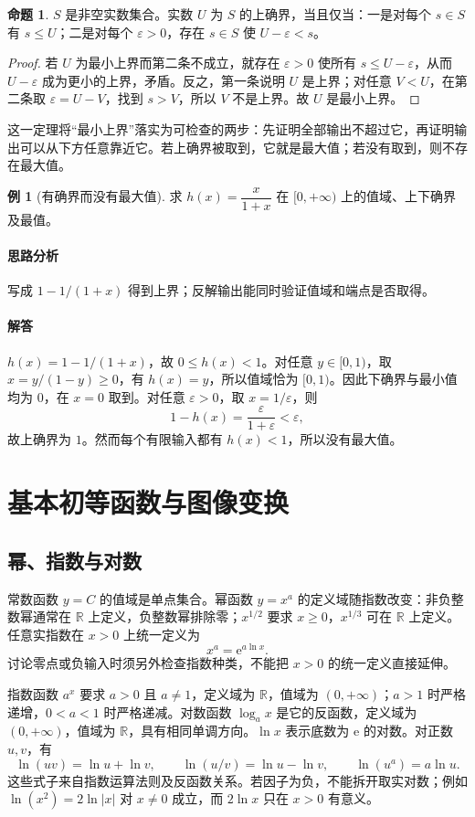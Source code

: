 \documentclass[UTF8,fontset=fandol,12pt,oneside,openany]{ctexrep}
\newcommand{\R}{\mathbb R}
\newcommand{\ee}{\mathrm e}
\theoremstyle{definition}
\newtheorem{proposition}[theorem]{命题}
\newtheorem{example}{例}[chapter]
\begin{document}
\begin{proposition}
$S$ 是非空实数集合。实数 $U$ 为 $S$ 的上确界，当且仅当：一是对每个 $s\in S$ 有 $s\le U$；二是对每个 $\varepsilon>0$，存在 $s\in S$ 使 $U-\varepsilon<s$。
\end{proposition}
\begin{proof}
若 $U$ 为最小上界而第二条不成立，就存在 $\varepsilon>0$ 使所有 $s\le U-\varepsilon$，从而 $U-\varepsilon$ 成为更小的上界，矛盾。反之，第一条说明 $U$ 是上界；对任意 $V<U$，在第二条取 $\varepsilon=U-V$，找到 $s>V$，所以 $V$ 不是上界。故 $U$ 是最小上界。
\end{proof}
这一定理将“最小上界”落实为可检查的两步：先证明全部输出不超过它，再证明输出可以从下方任意靠近它。若上确界被取到，它就是最大值；若没有取到，则不存在最大值。

\begin{example}[有确界而没有最大值]
求 $h(x)=\dfrac{x}{1+x}$ 在 $[0,+\infty)$ 上的值域、上下确界及最值。
\end{example}
\paragraph{思路分析} 写成 $1-1/(1+x)$ 得到上界；反解输出能同时验证值域和端点是否取得。
\paragraph{解答} $h(x)=1-1/(1+x)$，故 $0\le h(x)<1$。对任意 $y\in[0,1)$，取 $x=y/(1-y)\ge0$，有 $h(x)=y$，所以值域恰为 $[0,1)$。因此下确界与最小值均为 $0$，在 $x=0$ 取到。对任意 $\varepsilon>0$，取 $x=1/\varepsilon$，则
\[
 1-h(x)=\frac{\varepsilon}{1+\varepsilon}<\varepsilon,
\]
故上确界为 $1$。然而每个有限输入都有 $h(x)<1$，所以没有最大值。

\section{基本初等函数与图像变换}
\label{lec:01:elementary}
\subsection{幂、指数与对数}
常数函数 $y=C$ 的值域是单点集合。幂函数 $y=x^a$ 的定义域随指数改变：非负整数幂通常在 $\R$ 上定义，负整数幂排除零；$x^{1/2}$ 要求 $x\ge0$，$x^{1/3}$ 可在 $\R$ 上定义。任意实指数在 $x>0$ 上统一定义为
\[
 x^a=\ee^{a\ln x}.
\]
讨论零点或负输入时须另外检查指数种类，不能把 $x>0$ 的统一定义直接延伸。

指数函数 $a^x$ 要求 $a>0$ 且 $a\ne1$，定义域为 $\R$，值域为 $(0,+\infty)$；$a>1$ 时严格递增，$0<a<1$ 时严格递减。对数函数 $\log_a x$ 是它的反函数，定义域为 $(0,+\infty)$，值域为 $\R$，具有相同单调方向。$\ln x$ 表示底数为 $\ee$ 的对数。对正数 $u,v$，有
\[
 \ln(uv)=\ln u+\ln v,\qquad \ln(u/v)=\ln u-\ln v,
 \qquad \ln(u^a)=a\ln u.
\]
这些式子来自指数运算法则及反函数关系。若因子为负，不能拆开取实对数；例如 $\ln(x^2)=2\ln|x|$ 对 $x\ne0$ 成立，而 $2\ln x$ 只在 $x>0$ 有意义。
\end{document}
